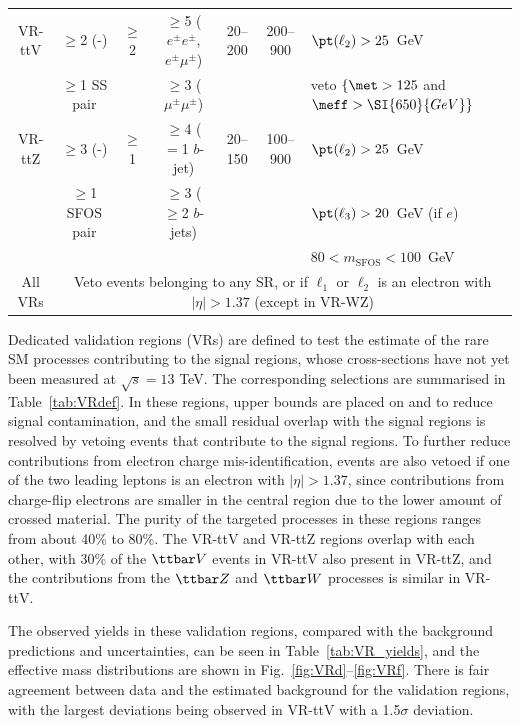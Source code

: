 \begin{table}[t!]
{\begin{tabular}{c|c|c|c|c|c|l}
VR-ttV    &$\geq$2 (-) &$\geq$2&  $\geq$5 ($e^\pm e^\pm$,$e^\pm \mu^\pm$) & 20--200  & 200--900 & $\pt(\ell_2)>25$~GeV\\
          & $\geq$1 SS pair  &         &  $\geq$3 ($\mu^\pm \mu^\pm$)             &          &         & veto $\{\met>125$ and $\meff>\SI{650}{GeV}\}$\\ \hline
VR-ttZ    &$\geq$3 (-) & $\geq$1 & $\geq$4 ($=$1 $b$-jet)         & 20--150  & 100--900 & $\pt(\ell_2)>25$~GeV\\
          &$\geq$1 SFOS pair &         & $\geq$3 ($\geq$2 $b$-jets) &           &     & $\pt(\ell_3)>20$~GeV (if $e$)\\
          &        &         &                           &          &         & $80<m_\text{SFOS}<100$~GeV \\
\hline\hline
All VRs & \multicolumn{6}{c}{Veto events belonging to any SR, or if $\ell_1$ or $\ell_2$ is an electron with $|\eta|>1.37$ (except in VR-WZ)}\\
\hline\hline
\end{tabular}
}
\end{table}

Dedicated validation regions (VRs) are defined to test the estimate of the rare SM processes contributing to the signal regions, 
whose cross-sections have not yet been measured at $\sqrt s=13$ TeV. 
The corresponding selections are summarised in Table~\ref{tab:VRdef}. 
In these regions, upper bounds are placed on \met and \meff{} to reduce signal contamination, 
and the small residual overlap with the signal regions is resolved by vetoing events that contribute to the signal regions.  
To further reduce contributions from electron charge mis-identification, 
events are also vetoed if one of the two leading leptons is an electron with $|\eta|>1.37$, 
since contributions from charge-flip electrons are smaller in the central region due to the lower amount of crossed material. 
The purity of the targeted processes in these regions ranges from about 40\% to $80\%$. 
The VR-ttV and VR-ttZ regions overlap with each other, with 30\% of the $\ttbar V$ events in VR-ttV 
also present in VR-ttZ, 
and the contributions from the $\ttbar Z$ and $\ttbar W$ processes is similar in VR-ttV.


The observed yields in these validation regions, compared with the background predictions and uncertainties, 
can be seen in Table~\ref{tab:VR_yields}, and the effective mass distributions are shown in Fig.~\ref{fig:VRd}--\ref{fig:VRf}.
There is fair agreement between data and the estimated background for the validation regions, 
with the largest deviations being observed in VR-ttV with a 1.5$\sigma$ deviation. 


